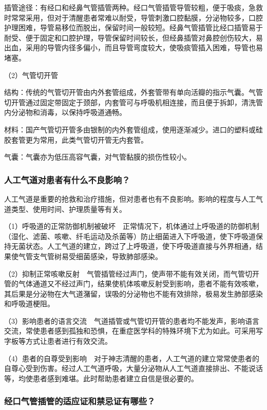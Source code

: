 插管途径：有经口和经鼻气管插管两种。经口气管插管导管较粗，便于吸痰，急救时常常采用，但对于清醒患者常难以耐受，导管刺激口腔黏膜，分泌物较多，口腔护理困难，导管易移位而脱出，保留时间一般较短。经鼻气管插管比经口插管易于耐受、便于固定和口腔护理，导管保留时间较长，但经鼻插管对鼻腔创伤较大，易出血，采用的导管内径多偏小，而且导管弯度较大，使吸痰管插入困难，导管也易堵塞。

（2）气管切开管

结构：传统的气管切开管由内外套管组成，外套管带有单向活瓣的指示气囊。气管切开管通过固定带固定于颈部，内套管可与呼吸机相连接，而且便于拆卸，清洗管内分泌物和消毒，以保持呼吸道通畅。

材料：国产气管切开管多由银制的内外套管组成，使用逐渐减少。进口的塑料或硅胶套管更为常用，此类气管切开管无内套管。

气囊：气囊亦为低压高容气囊，对气管黏膜的损伤性较小。

\subsubsection{人工气道对患者有什么不良影响？}

人工气道是重要的抢救和治疗措施，但对患者也有不良影响。影响的程度与人工气道类型、使用时间、护理质量等有关。

（1）呼吸道的正常防御机制被破坏　正常情况下，机体通过上呼吸道的防御机制（湿化、滤菌、咳嗽、纤毛运动及杀菌等）防止细菌进入下呼吸道，使下呼吸道保持无菌状态。人工气道的建立，跨过了上呼吸道，使下呼吸道直接与外界相通，结果使气管支气管树易受细菌感染，导致肺部感染。

（2）抑制正常咳嗽反射　气管插管经过声门，使声带不能有效关闭，而气管切开管的气体通道又不经过声门，结果使机体咳嗽反射受到影响，患者不能有效咳嗽，其后果是分泌物在大气道潴留，误吸的分泌物也不能有效排除，极易发生肺部感染和呼吸道梗阻。

（3）影响患者的语言交流　气道插管或气管切开管的患者均不能发声，影响语言交流，常使患者感到孤独和恐惧，在重症医学科的特殊环境下尤为如此。可采用写字板等方式让患者进行有效交流。

（4）患者的自尊受到影响　对于神志清醒的患者，人工气道的建立常常使患者的自尊心受到伤害。经过人工气道呼吸，大量分泌物从人工气道直接排出、不能说话等，均使患者感到难堪。此时帮助患者建立自信是很必要的。

\subsubsection{经口气管插管的适应证和禁忌证有哪些？}

